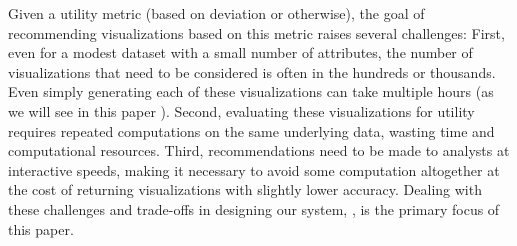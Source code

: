 
Given a utility metric (based on deviation or otherwise),
the goal of recommending visualizations based on this metric 
raises several challenges:
First, even for a modest dataset with a small number
of attributes, the number of  
visualizations that need to be considered is often in the hundreds or thousands.
Even simply generating each of these visualizations can take multiple hours 
(as we will see in this paper ).
Second, evaluating these visualizations for utility requires repeated
computations on the same underlying data, wasting time and computational resources.
Third, recommendations need to be made to analysts at interactive speeds,
making it necessary to avoid some computation altogether at the cost
of returning visualizations with slightly lower accuracy. 
Dealing with these challenges and trade-offs in designing our system, \SeeDB, 
is the primary focus of this paper. 






